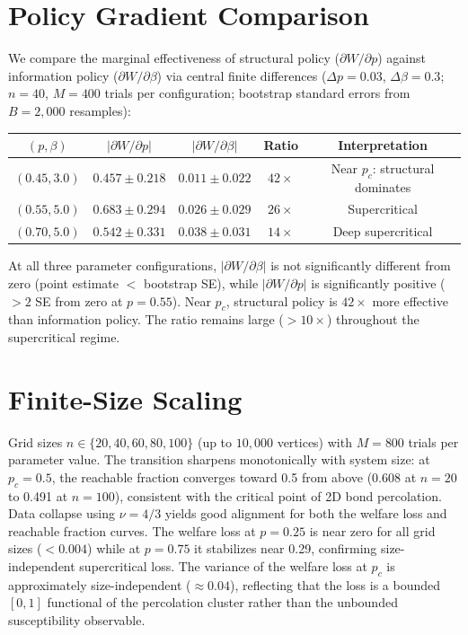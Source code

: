 \documentclass[12pt]{article}
\begin{document}
\section{Policy Gradient Comparison}

We compare the marginal effectiveness of structural policy ($\partial W / \partial p$) against information policy ($\partial W / \partial \beta$) via central finite differences ($\Delta p = 0.03$, $\Delta \beta = 0.3$; $n = 40$, $M = 400$ trials per configuration; bootstrap standard errors from $B = 2{,}000$ resamples):
\begin{center}
\begin{tabular}{ccccc}
\toprule
$(p, \beta)$ & $|\partial W/\partial p|$ & $|\partial W/\partial \beta|$ & Ratio & Interpretation \\
\midrule
$(0.45, 3.0)$ & $0.457 \pm 0.218$ & $0.011 \pm 0.022$ & $42\times$ & Near $p_c$: structural dominates \\
$(0.55, 5.0)$ & $0.683 \pm 0.294$ & $0.026 \pm 0.029$ & $26\times$ & Supercritical \\
$(0.70, 5.0)$ & $0.542 \pm 0.331$ & $0.038 \pm 0.031$ & $14\times$ & Deep supercritical \\
\bottomrule
\end{tabular}
\end{center}
At all three parameter configurations, $|\partial W/\partial \beta|$ is not significantly different from zero (point estimate $<$ bootstrap SE), while $|\partial W/\partial p|$ is significantly positive ($>2$ SE from zero at $p = 0.55$). Near $p_c$, structural policy is $42\times$ more effective than information policy. The ratio remains large ($>10\times$) throughout the supercritical regime.

\section{Finite-Size Scaling}

Grid sizes $n \in \{20, 40, 60, 80, 100\}$ (up to $10{,}000$ vertices) with $M = 800$ trials per parameter value. The transition sharpens monotonically with system size: at $p_c = 0.5$, the reachable fraction converges toward 0.5 from above (0.608 at $n=20$ to 0.491 at $n=100$), consistent with the critical point of 2D bond percolation. Data collapse using $\nu = 4/3$ yields good alignment for both the welfare loss and reachable fraction curves. The welfare loss at $p = 0.25$ is near zero for all grid sizes ($< 0.004$) while at $p = 0.75$ it stabilizes near 0.29, confirming size-independent supercritical loss. The variance of the welfare loss at $p_c$ is approximately size-independent ($\approx 0.04$), reflecting that the loss is a bounded $[0,1]$ functional of the percolation cluster rather than the unbounded susceptibility observable.
\end{document}
